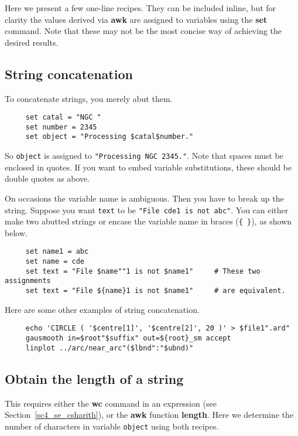 \documentclass[twoside,11pt]{article}
\newcommand{\htmlref}[2]{#1}
\newcommand{\latex}[1]{#1}
\newcommand{\xlabel}[1]{}
\begin{document}
Here we present a few one-line recipes.  They can be included inline,
but for clarity the values derived via {\bf awk} are assigned to
variables using the {\bf set} command.  Note that these may not be the
most concise way of achieving the desired results.

\subsection{\xlabel{sc4_se_string_conc}String concatenation
\label{sc4_se_string_conc}}

To concatenate strings, you merely abut them.

\small
\begin{verbatim}
     set catal = "NGC "
     set number = 2345
     set object = "Processing $catal$number."
\end{verbatim}
\normalsize
So {\tt object} is assigned to {\tt "Processing NGC 2345."}.
Note that spaces must be enclosed in quotes.  If you want to embed
variable substitutions, these should be double quotes as above.

On occasions the variable name is ambiguous.  Then you have to break up
the string.  Suppose you want {\tt text} to be {\tt "File cde1 is not
abc"}.  You can either make two abutted strings or encase the variable
name in braces (\verb+{+~\verb+}+), as shown below.

\small
\begin{verbatim}
     set name1 = abc
     set name = cde
     set text = "File $name""1 is not $name1"     # These two assignments
     set text = "File ${name}1 is not $name1"     # are equivalent.
\end{verbatim}
\normalsize

Here are some other examples of string concatenation.

\small
\begin{verbatim}
     echo 'CIRCLE ( '$centre[1]', '$centre[2]', 20 )' > $file1".ard"
     gausmooth in=$root"$suffix" out=${root}_sm accept
     linplot ../arc/near_arc"($lbnd":"$ubnd)"
\end{verbatim}
\normalsize

\newpage
\subsection{\xlabel{sc4_se_string_length}Obtain the length of a string
\label{sc4_se_string_length}}

This requires either the {\bf wc} command in an
\htmlref{expression}{sc4_se_csharith}\latex{ (see
Section~\ref{sc4_se_csharith})}, or the {\bf awk} function {\bf length}.
Here we determine the number of characters
in variable {\tt object} using both recipes.
\end{document}
